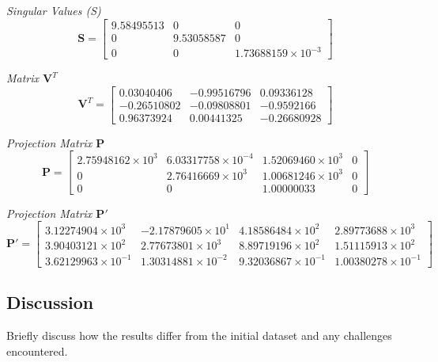 \documentclass{article}
\begin{document}
\textit{Singular Values (S)}
\[
\mathbf{S} = \begin{bmatrix}
9.58495513 & 0 & 0 \\ 
0 & 9.53058587 & 0 \\ 
0 & 0 & 1.73688159 \times 10^{-3} 
\end{bmatrix}
\]

\textit{Matrix $\mathbf{V}^T$}
\[
\mathbf{V}^T = \begin{bmatrix}
0.03040406 & -0.99516796 & 0.09336128 \\ 
-0.26510802 & -0.09808801 & -0.9592166 \\ 
0.96373924 & 0.00441325 & -0.26680928 
\end{bmatrix}
\]

\textit{Projection Matrix $\mathbf{P}$}
\[
\mathbf{P} = \begin{bmatrix}
2.75948162 \times 10^{3} & 6.03317758 \times 10^{-4} & 1.52069460 \times 10^{3} & 0 \\ 
0 & 2.76416669 \times 10^{3} & 1.00681246 \times 10^{3} & 0 \\ 
0 & 0 & 1.00000033 & 0 
\end{bmatrix}
\]

\textit{Projection Matrix $\mathbf{P}'$}
\[
\mathbf{P}' = \begin{bmatrix}
3.12274904 \times 10^{3} & -2.17879605 \times 10^{1} & 4.18586484 \times 10^{2} & 2.89773688 \times 10^{3} \\ 
3.90403121 \times 10^{2} & 2.77673801 \times 10^{3} & 8.89719196 \times 10^{2} & 1.51115913 \times 10^{2} \\ 
3.62129963 \times 10^{-1} & 1.30314881 \times 10^{-2} & 9.32036867 \times 10^{-1} & 1.00380278 \times 10^{-1} 
\end{bmatrix}
\]

\subsection{Discussion}
Briefly discuss how the results differ from the initial dataset and any challenges encountered.
\end{document}
